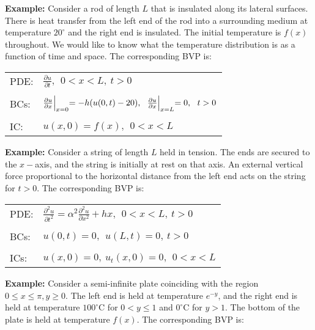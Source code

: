 \noindent\textbf{Example: } Consider a rod of length $L$ that is insulated along its lateral surfaces.  There is heat transfer from the left end of the rod into a surrounding medium at temperature $20^{\circ}$ and the right end is insulated.  The initial temperature is $f(x)$ throughout.  We would like to know what the temperature distribution is as a function of time and space.  The corresponding BVP is:
\begin{table}
\begin{tabular}{l l}
PDE: & $\frac{\partial u}{\partial t}, \ \ 0<x<L, \ t>0 $ \\
& \\
BCs: & $\frac{\partial u}{\partial x}\Bigl|_{x=0} = -h(u(0,t)-20), \ \  \frac{\partial u}{\partial x}\Bigl|_{x=L} = 0, \ \ t>0$ \\
& \\
IC: & $u(x,0) = f(x), \ \ 0<x<L$ \\
\end{tabular}
\end{table}

\vspace{0.5cm}

\noindent\textbf{Example: } Consider a string of length $L$ held in tension.  The ends are secured to the $x-$axis, and the string is initially at rest on that axis.  An external vertical force proportional to the horizontal distance from the left end acts on the string for $t>0$.  The corresponding BVP is:
\begin{table}
\begin{tabular}{l l}
PDE: & $\frac{\partial^2 u}{\partial t^2} = \alpha^2 \frac{\partial^2 u}{\partial x^2} + hx, \ \ 0<x<L, \ t>0 $ \\
& \\
BCs: & $u(0,t)=0, \ \ u(L,t) = 0, \ t>0 $ \\
& \\
ICs: & $u(x,0) = 0, \ u_t(x,0) = 0, \ \ 0<x<L$ \\
\end{tabular}
\end{table}

\vspace{0.5cm}

\noindent\textbf{Example: } Consider a semi-infinite plate coinciding with the region $0 \le x \le \pi, y\ge 0.$  The left end is held at temperature $e^{-y}$, and the right end is held at temperature $100^{\circ}$C for $0 < y \le 1$ and $0^{\circ}$C for $y>1$.  The bottom of the plate is held at temperature $f(x)$.  The corresponding BVP is:

